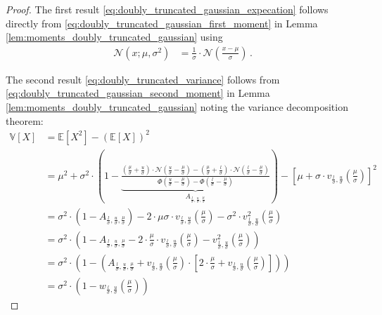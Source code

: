 \documentclass[a4paper]{article}
\newcommand{\Normal}[3]{{\mathcal N} \left({#1};{#2},{#3}\right)}
\newcommand{\NormalStandard}[1]{{\mathcal N} \left({#1}\right)}
\newcommand{\NormalStandardCDF}[1]{\Phi \left({#1}\right)}
\newcommand{\expect}[1]{{\mathbb E \left[ {#1} \right]}}
\newcommand{\var}[1]{{\mathbb V \left[ {#1} \right]}}
\theoremstyle{definition}
\begin{document}
\begin{proof}
    The first result \eqref{eq:doubly_truncated_gaussian_expecation} follows directly from \eqref{eq:doubly_truncated_gaussian_first_moment} in Lemma \ref{lem:moments_doubly_truncated_gaussian} using 
    \begin{align*}
        \Normal{x}{\mu}{\sigma^2} & = \frac{1}{\sigma} \cdot \NormalStandard{\frac{x-\mu}{\sigma}} \,.
    \end{align*}

    The second result \eqref{eq:doubly_truncated_variance} follows from \eqref{eq:doubly_truncated_gaussian_second_moment} in Lemma \ref{lem:moments_doubly_truncated_gaussian} noting the variance decomposition theorem:
    \begin{align*}
        \var{X} & = \expect{X^2} - \left( \expect{X}\right )^2 \\
        & = \mu^2 + \sigma^2 \cdot \left( 1 - \underbrace{\frac{\left( \frac{\mu}{\sigma} + \frac{u}{\sigma} \right) \cdot \NormalStandard{\frac{u}{\sigma} - \frac{\mu}{\sigma}} - \left( \frac{\mu}{\sigma} + \frac{l}{\sigma} \right) \cdot \NormalStandard{\frac{l}{\sigma} - \frac{\mu}{\sigma}}}{\NormalStandardCDF{\frac{u}{\sigma} - \frac{\mu}{\sigma}} - \NormalStandardCDF{\frac{l}{\sigma} - \frac{\mu}{\sigma}}}}_{A_{\frac{l}{\sigma},\frac{u}{\sigma},\frac{\mu}{\sigma}}} \right) - \left[ \mu + \sigma \cdot v_{\frac{l}{\sigma},\frac{u}{\sigma}}\left( \frac{\mu}{\sigma} \right) \right]^2 \\
        & = \sigma^2 \cdot \left( 1 - A_{\frac{l}{\sigma},\frac{u}{\sigma},\frac{\mu}{\sigma}} \right) - 2 \cdot \mu \sigma \cdot v_{\frac{l}{\sigma},\frac{u}{\sigma}}\left( \frac{\mu}{\sigma} \right) - \sigma^2 \cdot v^2_{\frac{l}{\sigma},\frac{u}{\sigma}}\left( \frac{\mu}{\sigma} \right) \\
        & = \sigma^2 \cdot \left( 1 - A_{\frac{l}{\sigma},\frac{u}{\sigma},\frac{\mu}{\sigma}} - 2 \cdot \frac{\mu}{\sigma} \cdot v_{\frac{l}{\sigma},\frac{u}{\sigma}}\left( \frac{\mu}{\sigma} \right) - v^2_{\frac{l}{\sigma},\frac{u}{\sigma}}\left( \frac{\mu}{\sigma} \right) \right) \\
        & = \sigma^2 \cdot \left( 1 - \left( A_{\frac{l}{\sigma},\frac{u}{\sigma},\frac{\mu}{\sigma}} + v_{\frac{l}{\sigma},\frac{u}{\sigma}}\left( \frac{\mu}{\sigma} \right) \cdot \left[ 2 \cdot \frac{\mu}{\sigma} + v_{\frac{l}{\sigma},\frac{u}{\sigma}}\left( \frac{\mu}{\sigma} \right) \right] \right) \right) \\
        & = \sigma^2 \cdot \left(1 - w_{\frac{l}{\sigma},\frac{u}{\sigma}}\left( \frac{\mu}{\sigma} \right) \right)
    \end{align*}
\end{proof}
\end{document}
